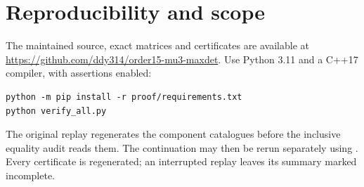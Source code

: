 \section{Reproducibility and scope}\label{sec:repro}
The maintained source, exact matrices and certificates are available at
\url{https://github.com/ddy314/order15-mu3-maxdet}.
Use Python 3.11 and a C++17 compiler, with assertions enabled:
\begin{verbatim}
python -m pip install -r proof/requirements.txt
python verify_all.py
\end{verbatim}
The original replay regenerates the component catalogues before the inclusive equality audit reads them. The continuation may then be rerun separately using . Every certificate is regenerated; an interrupted replay leaves its summary marked incomplete.

